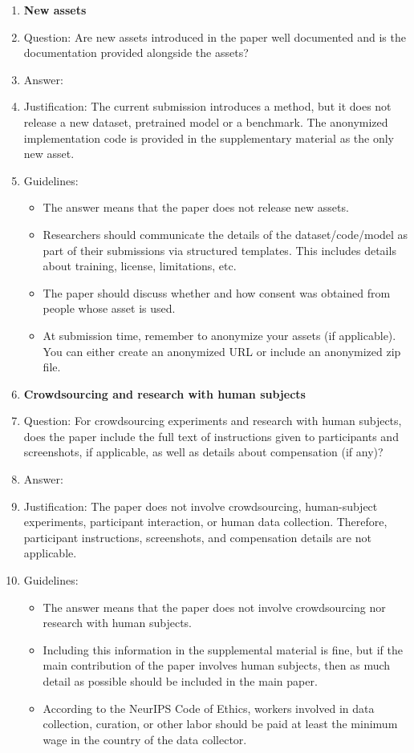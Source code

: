 \begin{enumerate}
\item {\bf New assets}
    \item[] Question: Are new assets introduced in the paper well documented and is the documentation provided alongside the assets?
    \item[] Answer: \answerYes{}
    \item[] Justification: The current submission introduces a method, but it does not release a new dataset, pretrained model or a benchmark. The anonymized implementation code is provided in the supplementary material as the only new asset.
    \item[] Guidelines:
    \begin{itemize}
        \item The answer \answerNA{} means that the paper does not release new assets.
        \item Researchers should communicate the details of the dataset\slash code\slash model as part of their submissions via structured templates. This includes details about training, license, limitations, etc. 
        \item The paper should discuss whether and how consent was obtained from people whose asset is used.
        \item At submission time, remember to anonymize your assets (if applicable). You can either create an anonymized URL or include an anonymized zip file.
    \end{itemize}

\item {\bf Crowdsourcing and research with human subjects}
    \item[] Question: For crowdsourcing experiments and research with human subjects, does the paper include the full text of instructions given to participants and screenshots, if applicable, as well as details about compensation (if any)? 
    \item[] Answer: \answerNA{}
    \item[] Justification: The paper does not involve crowdsourcing, human-subject experiments, participant interaction, or human data collection. Therefore, participant instructions, screenshots, and compensation details are not applicable.
    \item[] Guidelines:
    \begin{itemize}
        \item The answer \answerNA{} means that the paper does not involve crowdsourcing nor research with human subjects.
        \item Including this information in the supplemental material is fine, but if the main contribution of the paper involves human subjects, then as much detail as possible should be included in the main paper. 
        \item According to the NeurIPS Code of Ethics, workers involved in data collection, curation, or other labor should be paid at least the minimum wage in the country of the data collector. 
    \end{itemize}


\end{enumerate}
